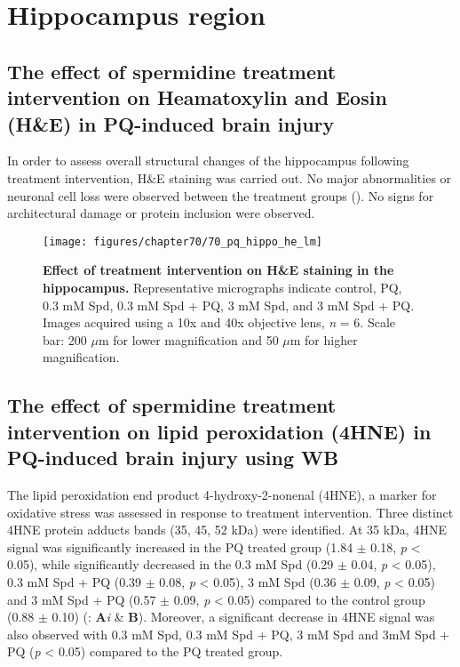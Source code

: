 \section{Hippocampus region}
\subsection{The effect of spermidine treatment intervention on Heamatoxylin and Eosin (H\&E) in PQ-induced brain injury}
In order to assess overall structural changes of the hippocampus following treatment intervention, H\&E staining was carried out. No major abnormalities or neuronal cell loss were observed between the treatment groups (). No signs for architectural damage or protein inclusion were observed.

\begin{figure}[!htbp]
\center
  \texttt{[image: figures/chapter70/70\_pq\_hippo\_he\_lm]}
  \caption[Effect of treatment intervention on H\&E staining in the hippocampus]{\textbf{Effect of treatment intervention on H\&E staining in the hippocampus.} Representative micrographs indicate control, PQ, 0.3 mM Spd, 0.3 mM Spd + PQ, 3 mM Spd, and 3 mM Spd + PQ. Images acquired using a 10x and 40x objective lens, \textit{n} = 6. Scale bar: 200 $\mu$m for lower magnification and 50 $\mu$m for higher magnification.}
  \label{fig:70_pq_hippo_he_lm}
\end{figure} 

\subsection{The effect of spermidine treatment intervention on lipid peroxidation (4HNE) in PQ-induced brain injury using WB}
The lipid peroxidation end product 4-hydroxy-2-nonenal (4HNE), a marker for oxidative stress was assessed in response to treatment intervention. Three distinct 4HNE protein adducts bands (35, 45, 52 kDa) were identified. At 35 kDa, 4HNE signal was significantly increased in the PQ treated group (1.84 $\pm$ 0.18, \textit{p} < 0.05), while significantly decreased in the 0.3 mM Spd (0.29 $\pm$ 0.04, \textit{p} < 0.05), 0.3 mM Spd + PQ (0.39 $\pm$ 0.08, \textit{p} < 0.05), 3 mM Spd (0.36 $\pm$ 0.09, \textit{p} < 0.05) and 3 mM Spd + PQ (0.57 $\pm$ 0.09, \textit{p} < 0.05) compared to the control group (0.88 $\pm$ 0.10) (: \textbf{A}\textit{i} \& \textbf{B}). Moreover, a significant decrease in 4HNE signal was also observed with 0.3 mM Spd, 0.3 mM Spd + PQ, 3 mM Spd and 3mM Spd + PQ (\textit{p} < 0.05) compared to the PQ treated group. 

